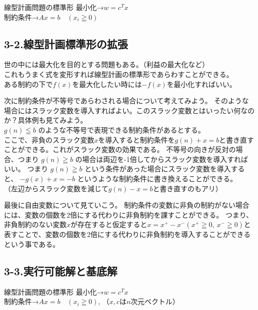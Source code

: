 \documentclass[platex,dvipdfmx]{jlreq}			%
\begin{document}
\begin{itembox}[l]{線型計画問題の標準形}
最小化→$ w=c^Tx $\\
制約条件→$ Ax=b \quad (x_i\geqq0)$
\end{itembox}

\subsection*{3-2.線型計画標準形の拡張}

世の中には最大化を目的とする問題もある。（利益の最大化など）\\
これもうまく式を変形すれば線型計画の標準形であらわすことができる。\\
ある制約の下で$f(x)$を最大化したい時には$-f(x)$を最小化すればいい。

次に制約条件が不等号であらわされる場合について考えてみよう。
そのような場合には$\textbf{スラック変数}$を導入すればよい。このスラック変数とはいったい何なのか？具体例も見てみよう。\\
$g(n) \leqq b $
のような不等号で表現できる制約条件があるとする。\\
ここで、非負のスラック変数$x$を導入すると制約条件を$g(n)+x = b$と書き直すことができる。これがスラック変数の効果である。
不等号の向きが反対の場合、つまり $g(n) \geqq b $  の場合は両辺を-1倍してからスラック変数を導入すればいい。
つまり $g(n) \geqq b$ という条件があった場合にスラック変数を導入すると、 $-g(x)+x = -b$ というような制約条件に書き換えることができる。\\
（左辺からスラック変数を減じて$g(n)-x=b$と書き直すのもアリ）

最後に自由変数について見ていこう。
制約条件の変数に非負の制約がない場合には、変数の個数を2倍にする代わりに非負制約を課すことができる。
つまり、非負制約のない変数$x$が存在すると仮定すると$x = x^+ - x^-　(x^+ \geqq 0 , \: x^- \geqq 0)　$と表すことで、変数の個数を2倍にする代わりに非負制約を導入することができるという事である。\\



\subsection*{3-3.実行可能解と基底解}

\begin{itembox}[l]{線型計画問題の標準形}
最小化→$ w=c^Tx $\\
制約条件→$ Ax=b \quad (x_i\geqq0)$, （$x,c$は$n次元ベクトル$）
\end{itembox}
\end{document}
